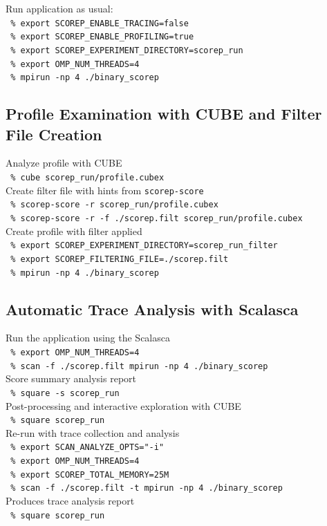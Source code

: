 \setlength{\topskip}{3em}
Run application as usual:\\
\texttt{ \% export SCOREP\_ENABLE\_TRACING=false}\\
\texttt{ \% export SCOREP\_ENABLE\_PROFILING=true}\\
\texttt{ \% export SCOREP\_EXPERIMENT\_DIRECTORY=scorep\_run}\\
\texttt{ \% export OMP\_NUM\_THREADS=4}\\
\texttt{ \% mpirun -np 4 ./binary\_scorep}\\

\vspace{1em}

\subsection{Profile Examination with CUBE and Filter File Creation}
Analyze profile with CUBE\\
\texttt{ \% cube scorep\_run/profile.cubex}\\
Create filter file with hints from \texttt{scorep-score}\\
\texttt{ \% scorep-score -r scorep\_run/profile.cubex}\\
\texttt{ \% scorep-score -r -f ./scorep.filt scorep\_run/profile.cubex}\\
Create profile with filter applied\\
\texttt{ \% export SCOREP\_EXPERIMENT\_DIRECTORY=scorep\_run\_filter}\\
\texttt{ \% export SCOREP\_FILTERING\_FILE=./scorep.filt}\\
\texttt{ \% mpirun -np 4 ./binary\_scorep}\\


\subsection{Automatic Trace Analysis with Scalasca}
Run the application using the Scalasca\\
\texttt{ \% export OMP\_NUM\_THREADS=4}\\
\texttt{ \% scan -f ./scorep.filt  mpirun -np 4 ./binary\_scorep}\\
Score summary analysis report\\
\texttt{ \% square -s scorep\_run}\\
Post-processing and interactive exploration with CUBE\\
\texttt{ \% square scorep\_run}\\
Re-run with trace collection and analysis\\
\texttt{ \% export SCAN\_ANALYZE\_OPTS="-i"}\\
\texttt{ \% export OMP\_NUM\_THREADS=4}\\
\texttt{ \% export SCOREP\_TOTAL\_MEMORY=25M}\\
\texttt{ \% scan -f ./scorep.filt -t mpirun -np 4 ./binary\_scorep}\\
Produces trace analysis report\\
\texttt{ \% square scorep\_run}\\

